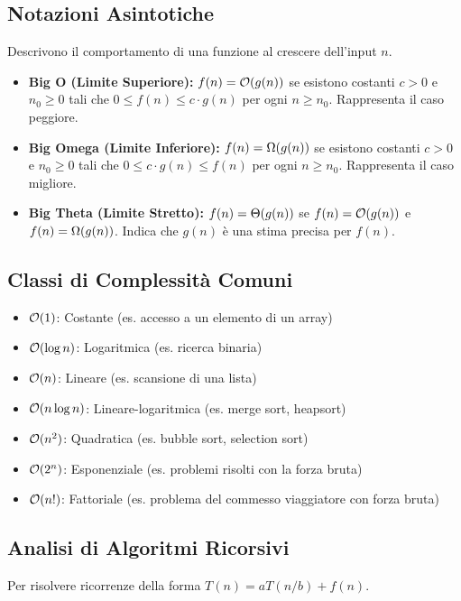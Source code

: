 \subsection*{Notazioni Asintotiche}
Descrivono il comportamento di una funzione al crescere dell'input $n$.
\begin{itemize}
    \item \textbf{Big O (Limite Superiore):} $f(n) = \mathcal{O}(g(n))$ se esistono costanti $c > 0$ e $n_0 \geq 0$ tali che $0 \le f(n) \le c \cdot g(n)$ per ogni $n \ge n_0$. Rappresenta il caso peggiore.
    \item \textbf{Big Omega (Limite Inferiore):} $f(n) = \Omega(g(n))$ se esistono costanti $c > 0$ e $n_0 \geq 0$ tali che $0 \le c \cdot g(n) \le f(n)$ per ogni $n \ge n_0$. Rappresenta il caso migliore.
    \item \textbf{Big Theta (Limite Stretto):} $f(n) = \Theta(g(n))$ se $f(n) = \mathcal{O}(g(n))$ e $f(n) = \Omega(g(n))$. Indica che $g(n)$ è una stima precisa per $f(n)$.
\end{itemize}

\subsection*{Classi di Complessità Comuni}
\begin{itemize}
    \item $\mathcal{O}(1)$: Costante (es. accesso a un elemento di un array)
    \item $\mathcal{O}(\log n)$: Logaritmica (es. ricerca binaria)
    \item $\mathcal{O}(n)$: Lineare (es. scansione di una lista)
    \item $\mathcal{O}(n \log n)$: Lineare-logaritmica (es. merge sort, heapsort)
    \item $\mathcal{O}(n^2)$: Quadratica (es. bubble sort, selection sort)
    \item $\mathcal{O}(2^n)$: Esponenziale (es. problemi risolti con la forza bruta)
    \item $\mathcal{O}(n!)$: Fattoriale (es. problema del commesso viaggiatore con forza bruta)
\end{itemize}

\subsection*{Analisi di Algoritmi Ricorsivi}
Per risolvere ricorrenze della forma $T(n) = aT(n/b) + f(n)$.
